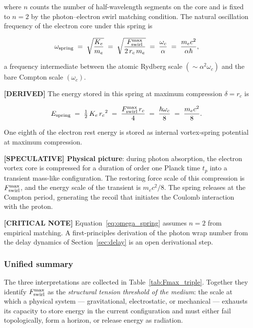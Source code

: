 \documentclass[11pt]{article}
\theoremstyle{definition}
\theoremstyle{plain}
\theoremstyle{remark}
\newcommand{\rc}{{r_c}}
\begin{document}
        where $n$ counts the number of half-wavelength segments on the core and is fixed to $n=2$ by the photon--electron swirl matching condition. The natural oscillation frequency of the electron core under this spring is

        \begin{align}
            \omega_{\rm spring}
            \;=\; \sqrt{\frac{K_e}{m_e}}
            \;=\; \sqrt{\frac{F_{\rm swirl}^{\max}}{2\,\rc\,m_e}}
            \;=\; \frac{\omega_c}{\alpha}
            \;=\; \frac{m_e c^2}{\alpha\hbar},
            \label{eq:omega_spring}
        \end{align}

        a frequency intermediate between the atomic Rydberg scale $(\sim\alpha^2\omega_c)$ and the bare Compton scale $(\omega_c)$.

        \textbf{[DERIVED]} The energy stored in this spring at maximum compression $\delta = \rc$ is

        \begin{align}
            E_{\rm spring}
            \;=\; \tfrac{1}{2}\,K_e\,\rc^2
            \;=\; \frac{F_{\rm swirl}^{\max}\,\rc}{4}
            \;=\; \frac{\hbar\omega_c}{8}
            \;=\; \frac{m_e c^2}{8}.
            \label{eq:Espring}
        \end{align}

        One eighth of the electron rest energy is stored as internal vortex-spring potential at maximum compression.

        \textbf{[SPECULATIVE] Physical picture}: during photon absorption, the electron vortex core is compressed for a duration of order one Planck time $t_p$ into a transient mass-like configuration. The restoring force scale of this compression is $F_{\rm swirl}^{\max}$, and the energy scale of the transient is $m_e c^2/8$. The spring releases at the Compton period, generating the recoil that initiates the Coulomb interaction with the proton.

        \textbf{[CRITICAL NOTE]} Equation~\eqref{eq:omega_spring} assumes $n=2$ from empirical matching. A first-principles derivation of the photon wrap number from the delay dynamics of Section~\ref{sec:delay} is an open derivational step.

        \subsubsection{Unified summary}

        The three interpretations are collected in Table~\ref{tab:Fmax_triple}. Together they identify $F_{\rm swirl}^{\max}$ as the \emph{structural tension threshold of the medium}: the scale at which a physical system --- gravitational, electrostatic, or mechanical --- exhausts its capacity to store energy in the current configuration and must either fail topologically, form a horizon, or release energy as radiation.
\end{document}
